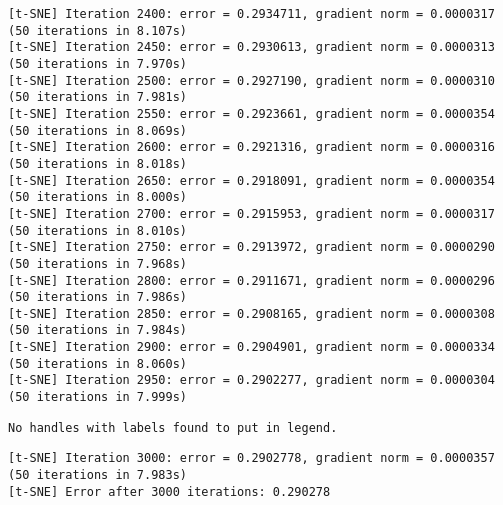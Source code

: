 \documentclass[11pt]{article}
\begin{document}
\begin{Verbatim}[commandchars=\\\{\}]
[t-SNE] Iteration 2400: error = 0.2934711, gradient norm = 0.0000317 (50 iterations in 8.107s)
[t-SNE] Iteration 2450: error = 0.2930613, gradient norm = 0.0000313 (50 iterations in 7.970s)
[t-SNE] Iteration 2500: error = 0.2927190, gradient norm = 0.0000310 (50 iterations in 7.981s)
[t-SNE] Iteration 2550: error = 0.2923661, gradient norm = 0.0000354 (50 iterations in 8.069s)
[t-SNE] Iteration 2600: error = 0.2921316, gradient norm = 0.0000316 (50 iterations in 8.018s)
[t-SNE] Iteration 2650: error = 0.2918091, gradient norm = 0.0000354 (50 iterations in 8.000s)
[t-SNE] Iteration 2700: error = 0.2915953, gradient norm = 0.0000317 (50 iterations in 8.010s)
[t-SNE] Iteration 2750: error = 0.2913972, gradient norm = 0.0000290 (50 iterations in 7.968s)
[t-SNE] Iteration 2800: error = 0.2911671, gradient norm = 0.0000296 (50 iterations in 7.986s)
[t-SNE] Iteration 2850: error = 0.2908165, gradient norm = 0.0000308 (50 iterations in 7.984s)
[t-SNE] Iteration 2900: error = 0.2904901, gradient norm = 0.0000334 (50 iterations in 8.060s)
[t-SNE] Iteration 2950: error = 0.2902277, gradient norm = 0.0000304 (50 iterations in 7.999s)

    \end{Verbatim}

    \begin{Verbatim}[commandchars=\\\{\}]
No handles with labels found to put in legend.

    \end{Verbatim}

    \begin{Verbatim}[commandchars=\\\{\}]
[t-SNE] Iteration 3000: error = 0.2902778, gradient norm = 0.0000357 (50 iterations in 7.983s)
[t-SNE] Error after 3000 iterations: 0.290278

    \end{Verbatim}

    \begin{center}
    \end{center}
    { \hspace*{\fill} \\}
    

    
    
    
    
\end{document}
